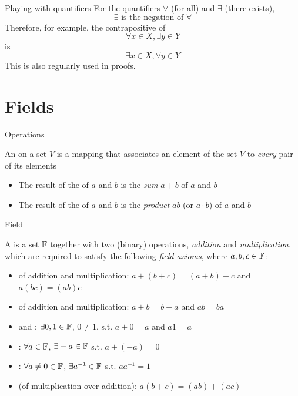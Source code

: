 \documentclass[aspectratio=169]{beamer}
\begin{document}
\begin{frame}{Playing with quantifiers}
For the quantifiers $\forall$ (for all) and $\exists$ (there exists),
\[
    \exists \text{ is the negation of } \forall
\]
Therefore, for example, the contrapositive of
\[
\forall x\in X,\exists y\in Y
\]
is
\[
\exists x\in X,\forall y\in Y
\]
This is also regularly used in proofs.
\end{frame}



\section{Fields}

\begin{frame}{Operations}
\begin{definition}
An  on a set $V$ is a mapping that associates an element of the set $V$ to \emph{every} pair of its elements
\begin{itemize}
\item The result of the  of $a$ and $b$ is the \emph{sum} $a+b$ of $a$ and $b$
\item The result of the  of $a$ and $b$ is the \emph{product} $ab$ (or $a\cdot b$) of $a$ and $b$
\end{itemize}
\end{definition}
\end{frame}

\begin{frame}{Field}
\begin{definition}[Field]
A  is a set $\mathbb{F}$ together with two (binary) operations, \emph{addition} and \emph{multiplication}, which are required to satisfy the following \emph{field axioms}, where $a,b,c\in\mathbb{F}$:
\begin{itemize}
\item {} of addition and multiplication: $a+(b+c)=(a+b)+c$ and $a(bc)=(ab)c$
\item {} of addition and multiplication: $a+b=b+a$ and $ab=ba$
\item {} and : $\exists 0,1\in\mathbb{F}$, $0\neq 1$, s.t. $a+0=a$ and $a1=a$
\item {}: $\forall a\in\mathbb{F}$, $\exists -a\in\mathbb{F}$ s.t. $a+(-a)=0$
\item {}: $\forall a\neq 0\in\mathbb{F}$, $\exists a^{-1}\in\mathbb{F}$ s.t. $aa^{-1}=1$
\item {} (of multiplication over addition): $a(b+c)=(ab)+(ac)$
\end{itemize}
\end{definition}
\end{frame}
\end{document}
